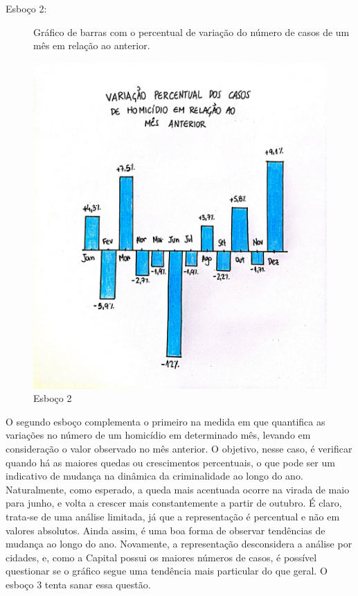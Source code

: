 \documentclass[article,12pt,openright,oneside,a4paper,brazil]{abntex2}
\begin{document}
    \begin{description}
        \item[Esboço 2:] Gráfico de barras com o percentual de variação do número de casos de um mês em relação ao anterior.
    \end{description}

    \begin{figure}[H]
        \centering
        \includegraphics[width=15cm]{graphs/graph2.jpg}
        \caption{Esboço 2}
        \label{fig:esboco_2}
    \end{figure}

    O segundo esboço complementa o primeiro na medida em que quantifica as variações no número de um homicídio em determinado mês, levando em consideração o valor observado no mês anterior. O objetivo, nesse caso, é verificar quando há as maiores quedas ou crescimentos percentuais, o que pode ser um indicativo de mudança na dinâmica da criminalidade ao longo do ano. Naturalmente, como esperado, a queda mais acentuada ocorre na virada de maio para junho, e volta a crescer mais constantemente a partir de outubro. É claro, trata-se de uma análise limitada, já que a representação é percentual e não em valores absolutos. Ainda assim, é uma boa forma de observar tendências de mudança ao longo do ano. Novamente, a representação desconsidera a análise por cidades, e, como a Capital possui os maiores números de casos, é possível questionar se o gráfico segue uma tendência mais particular do que geral. O esboço 3 tenta sanar essa questão.
\end{document}
